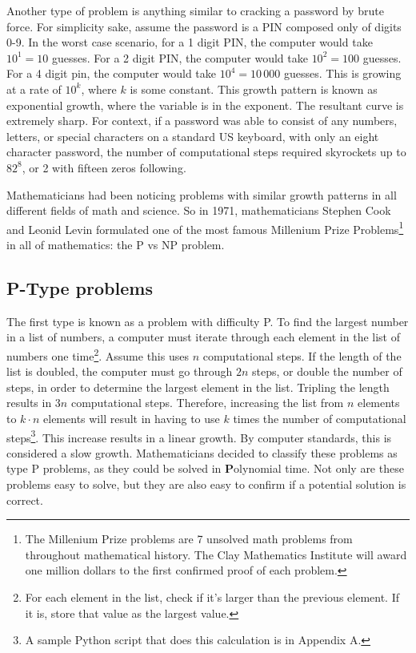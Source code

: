 \documentclass[10pt,journal,compsoc]{IEEEtran}
\begin{document}
Another type of problem is anything similar to cracking a password by brute force. For simplicity sake, assume the password is a PIN composed only of digits 0-9. In the worst case scenario, for a 1 digit PIN, the computer would take $10^1=10$ guesses. For a 2 digit PIN, the computer would take $10^2 = 100$ guesses. For a 4 digit pin, the computer would take $10^4=10\,000$ guesses. This is growing at a rate of $10^k$, where $k$ is some constant. This growth pattern is known as exponential growth, where the variable is in the exponent. The resultant curve is extremely sharp. For context, if a password was able to consist of any numbers, letters, or special characters on a standard US keyboard, with only an eight character password, the number of computational steps required skyrockets up to $82^8$, or 2 with fifteen zeros following. 

Mathematicians had been noticing problems with similar growth patterns in all different fields of math and science. So in 1971, mathematicians Stephen Cook and Leonid Levin formulated one of the most famous Millenium Prize Problems\footnote{The Millenium Prize problems are 7 unsolved math problems from throughout mathematical history. The Clay Mathematics Institute will award one million dollars to the first confirmed proof of each problem.} in all of mathematics: the P vs NP problem.
\subsection{P-Type problems} The first type is known as a problem with difficulty P. To find the largest number in a list of numbers, a computer must iterate through each element in the list of numbers one time\footnote{For each element in the list, check if it's larger than the previous element. If it is, store that value as the largest value.}. Assume this uses $n$ computational steps. If the length of the list is doubled, the computer must go through $2n$ steps, or double the number of steps, in order to determine the largest element in the list. Tripling the length results in $3n$ computational steps. Therefore, increasing the list from $n$ elements to $k\cdot n $ elements will result in having to use $k$ times the number of computational steps\footnote{A sample Python script that does this calculation is in Appendix A.}. This increase results in a linear growth. By computer standards, this is considered a slow growth. Mathematicians decided to classify these problems as type P problems, as they could be solved in  \textbf{P}olynomial time. Not only are these problems easy to solve, but they are also easy to confirm if a potential solution is correct. 
\end{document}
